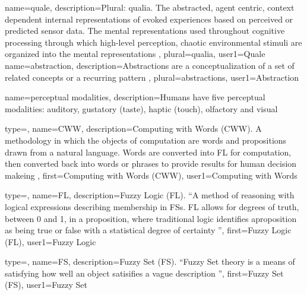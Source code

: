 {
  name=quale,
  description={Plural: qualia.
  The abstracted, \gls{agent centric}, context dependent internal representations of evoked experiences based on perceived or predicted sensor data. The mental representations used throughout cognitive processing through which high-level perception, chaotic environmental stimuli are organized into the mental representations \citep{chalmers1992high, hubbard1996importance}},
  plural=qualia,
  user1={Quale}
}
{
  name=abstraction,
  description={Abstractions are a conceptualization of a set of related concepts or a recurring pattern \citep{henson2012semantic}},
  plural=abstractions,
  user1={Abstraction}
}

{
  name=perceptual modalities,
  description={Humans have five perceptual modalities: auditory, \gls{gustatory} (taste), haptic (touch), olfactory and visual \citep{lynott2009embodied}}
}

{
  type=\acronymtype,
  name=CWW,
  description={Computing with Words (CWW).  A methodology in which the objects of computation are words and propositions drawn from a natural language. Words are converted into \gls{FL} for computation, then converted back into words or phrases to provide results for human decision makeing \citep{zadeh1999computing}},
  first={Computing with Words (CWW)},
  user1={Computing with Words}
}

{
  type=\acronymtype,
  name=FL,
  description={Fuzzy Logic (FL).  ``A method of reasoning with logical expressions describing membership in \glspl{FS}.  FL allows for degrees of truth, between 0 and 1, in a proposition, where traditional logic identifies aproposition as being true or false with a statistical degree of certainty \citep{russell2009artificial}''},
  first={Fuzzy Logic (FL)},
  user1={Fuzzy Logic}
}

{
  type=\acronymtype,
  name=FS,
  description={Fuzzy Set (FS).  ``Fuzzy Set theory is a means of satisfying how well an object satisifies a vague description \citep{russell2009artificial}''},
  first={Fuzzy Set (FS)},
  user1={Fuzzy Set}
}

